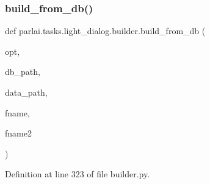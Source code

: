 \subsubsection{\texorpdfstring{build\+\_\+from\+\_\+db()}{build\_from\_db()}}
{\footnotesize\ttfamily def parlai.\+tasks.\+light\+\_\+dialog.\+builder.\+build\+\_\+from\+\_\+db (\begin{DoxyParamCaption}\item[{}]{opt,  }\item[{}]{db\+\_\+path,  }\item[{}]{data\+\_\+path,  }\item[{}]{fname,  }\item[{}]{fname2 }\end{DoxyParamCaption})}



Definition at line 323 of file builder.\+py.


